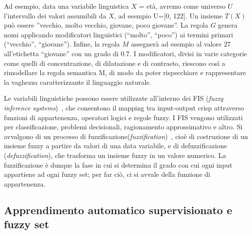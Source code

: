 \documentclass[11pt,  oneside, openany]{book}
\begin{document}
Ad esempio, data una variabile linguistica $X$ = età, avremo come universo $U$ l'intervallo dei valori assumibili da $X$, ad esempio U=[0, 122]. Un insieme $T(X)$ può essere ''vecchio, molto vecchio, giovane, poco giovane''. La regola $G$ genera nomi applicando modificatori linguistici (``molto'', ``poco'') ai termini primari (``vecchio'', ``giovane''). Infine, la regola $M$ assegnerà ad esempio al valore 27 all'etichetta ``giovane'' con un grado di 0.7. I modificatori, divisi in varie categorie come quelli di concentrazione, di dilatazione e di contrasto, riescono così a rimodellare la regola semantica M, di modo da poter rispecchiare e rappresentare la vaghezza caratterizzante il linguaggio naturale. 

Le variabili linguistiche possono essere utilizzate all'interno dei FIS (\textit{fuzzy inference systems})~\cite{fis}, che consentono il mapping tra input-output crisp attraverso funzioni di appartenenza, operatori logici e regole fuzzy. I FIS vengono utilizzati per classificazione, problemi decisionali, ragionamento approssimativo e altro. Si avvalgono di un processo di fuzzificazione(\textit{fuzzification})~\cite{fuzzific}, cioè di costruzione di un insieme fuzzy a partire da valori di una data variabile, e di defuzzificazione (\textit{defuzzification}), che trasforma un insieme fuzzy in un valore numerico. La fuzzificazione è dunque la fase in cui si determina il grado con cui ogni input appartiene ad ogni fuzzy set; per far ciò, ci si avvale della funzione di appartenenza. 

\subsection{Apprendimento automatico supervisionato e fuzzy set}
\end{document}
